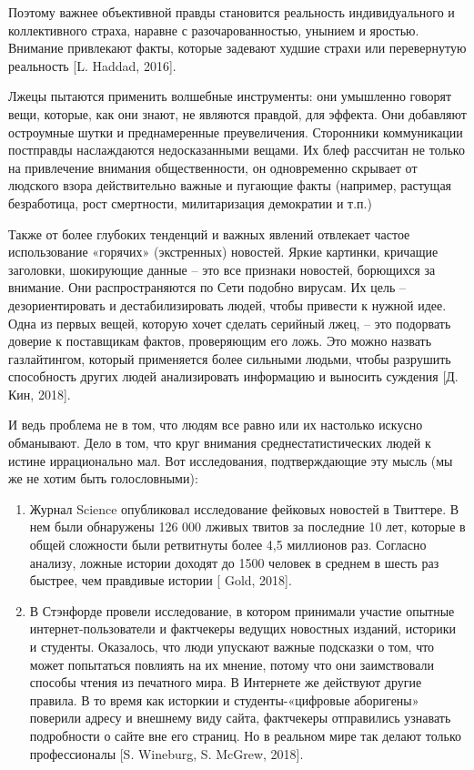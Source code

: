 Поэтому важнее объективной правды становится реальность индивидуального и коллективного страха, наравне с разочарованностью, унынием и яростью. Внимание привлекают факты, которые задевают худшие страхи или перевернутую реальность [L. Haddad, 2016].

Лжецы пытаются применить волшебные инструменты: они умышленно говорят вещи, которые, как они знают, не являются правдой, для эффекта. Они добавляют остроумные шутки и преднамеренные преувеличения. Сторонники коммуникации постправды наслаждаются недосказанными вещами. Их блеф рассчитан не только на привлечение внимания общественности, он одновременно скрывает от людского взора действительно важные и пугающие факты (например, растущая безработица, рост смертности, милитаризация демократии и т.п.)

Также от более глубоких тенденций и важных явлений отвлекает частое использование «горячих» (экстренных) новостей. Яркие картинки, кричащие заголовки, шокирующие данные – это все признаки новостей, борющихся за внимание. Они распространяются по Сети подобно вирусам. Их цель – дезориентировать и дестабилизировать людей, чтобы привести к нужной идее. Одна из первых вещей, которую хочет сделать серийный лжец, – это подорвать доверие к поставщикам фактов, проверяющим его ложь. Это можно назвать газлайтингом, который применяется более сильными людьми, чтобы разрушить способность других людей анализировать информацию и выносить суждения [Д. Кин, 2018].

И ведь проблема не в том, что людям все равно или их настолько искусно обманывают. Дело в том, что круг внимания среднестатистических людей к истине иррационально мал. Вот исследования, подтверждающие эту мысль (мы же не хотим быть голословными):

\begin{enumerate}
    \item Журнал Science опубликовал исследование фейковых новостей в Твиттере. В нем были обнаружены 126 000 лживых твитов за последние 10 лет, которые в общей сложности были ретвитнуты более 4,5 миллионов раз. Согласно анализу, ложные истории доходят до 1500 человек в среднем в шесть раз быстрее, чем правдивые истории [ Gold, 2018].
    \item В Стэнфорде провели исследование, в котором принимали участие опытные интернет-пользователи и фактчекеры ведущих новостных изданий, историки и студенты. Оказалось, что люди упускают важные подсказки о том, что может попытаться повлиять на их мнение, потому что они заимствовали способы чтения из печатного мира. В Интернете же действуют другие правила. В то время как исторкии и студенты-«цифровые аборигены» поверили адресу и внешнему виду сайта, фактчекеры отправились узнавать подробности о сайте вне его страниц. Но в реальном мире так делают только профессионалы [S. Wineburg, S. McGrew, 2018].
\end{enumerate}

